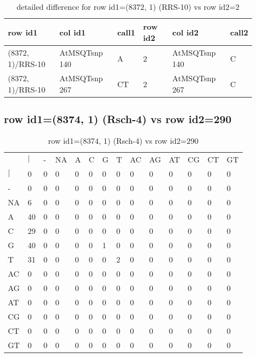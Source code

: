 \begin{center}
\begin{longtable}{|l|l|l|l|l|l|}
\caption{detailed difference for row id1=(8372, 1) (RRS-10) vs row id2=2} \label{table_dm603}\\
\hline
row id1&col id1&call1&row id2&col id2&call2\\
\hline
(8372, 1)/RRS-10&AtMSQTsnp 140&A&2&AtMSQTsnp 140&C\\
(8372, 1)/RRS-10&AtMSQTsnp 267&CT&2&AtMSQTsnp 267&C\\
\hline
\end{longtable}
\end{center}

\subsection{row id1=(8374, 1) (Rsch-4) vs row id2=290}
\begin{center}
\begin{longtable}{|l|l|l|l|l|l|l|l|l|l|l|l|l|l|}
\caption{row id1=(8374, 1) (Rsch-4) vs row id2=290} \label{table_dm604}\\
\hline
\\
\hline
&$|$&-&NA&A&C&G&T&AC&AG&AT&CG&CT&GT\\
$|$&0&0&0&0&0&0&0&0&0&0&0&0&0\\
-&0&0&0&0&0&0&0&0&0&0&0&0&0\\
NA&6&0&0&0&0&0&0&0&0&0&0&0&0\\
A&40&0&0&0&0&0&0&0&0&0&0&0&0\\
C&29&0&0&0&0&0&0&0&0&0&0&0&0\\
G&40&0&0&0&0&1&0&0&0&0&0&0&0\\
T&31&0&0&0&0&0&2&0&0&0&0&0&0\\
AC&0&0&0&0&0&0&0&0&0&0&0&0&0\\
AG&0&0&0&0&0&0&0&0&0&0&0&0&0\\
AT&0&0&0&0&0&0&0&0&0&0&0&0&0\\
CG&0&0&0&0&0&0&0&0&0&0&0&0&0\\
CT&0&0&0&0&0&0&0&0&0&0&0&0&0\\
GT&0&0&0&0&0&0&0&0&0&0&0&0&0\\
\hline
\end{longtable}
\end{center}

